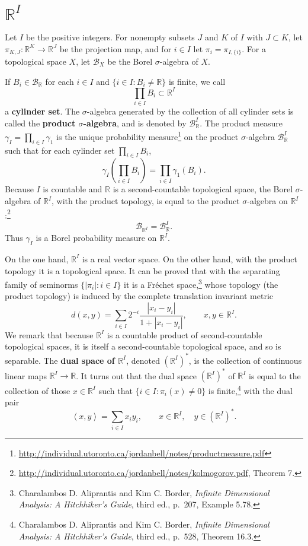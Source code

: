 \documentclass{article}
\newcommand{\inner}[2]{\left\langle #1, #2 \right\rangle}
\theoremstyle{definition}
\begin{document}
\section{$\mathbb{R}^I$}
Let $I$ be the positive integers. 
For nonempty subsets $J$ and $K$ of $I$ with $J \subset K$, let $\pi_{K,J}:\mathbb{R}^K \to \mathbb{R}^J$ be the projection
map, and for $i \in I$ let $\pi_i = \pi_{I,\{i\}}$. 
For a topological space $X$, let $\mathscr{B}_X$ be the Borel $\sigma$-algebra of $X$.

If $B_i \in \mathscr{B}_{\mathbb{R}}$ for each $i \in I$ and $\{i \in I: B_i \neq \mathbb{R}\}$ is finite,
we call
\[
\prod_{i \in I} B_i \subset \mathbb{R}^I
\]
a \textbf{cylinder set}. 
The $\sigma$-algebra generated by the collection of all cylinder sets is called the \textbf{product
$\sigma$-algebra}, and is denoted by
$\mathscr{B}_{\mathbb{R}}^I$.
The product measure $\gamma_I = \prod_{i \in I} \gamma_1$ is the unique probability measure\footnote{\url{http://individual.utoronto.ca/jordanbell/notes/productmeasure.pdf}} on the product $\sigma$-algebra $\mathscr{B}_{\mathbb{R}}^I$ such that
for each cylinder set $\prod_{i \in I} B_i$,
\[
\gamma_I \left( \prod_{i \in I} B_i \right) = \prod_{i \in I} \gamma_1(B_i).
\]
Because $I$ is countable and $\mathbb{R}$ is a second-countable topological space, the Borel $\sigma$-algebra of
$\mathbb{R}^I$, with the product topology, is equal to the product $\sigma$-algebra on $\mathbb{R}^I$:\footnote{\url{http://individual.utoronto.ca/jordanbell/notes/kolmogorov.pdf},
Theorem 7.}
\[
\mathscr{B}_{\mathbb{R}^I} = \mathscr{B}_{\mathbb{R}}^I.
\]
Thus $\gamma_I$ is a Borel probability measure on $\mathbb{R}^I$. 


On the one hand, $\mathbb{R}^I$ is a real vector space. On the other hand, with the product topology it is a topological space.
It can be proved that
with the separating family of seminorms $\{|\pi_i|: i \in I\}$ it is a Fr\'echet space,\footnote{Charalambos D. Aliprantis
and Kim C. Border, {\em Infinite Dimensional Analysis: A Hitchhiker's Guide}, third ed., p.~207, Example 5.78.} whose topology (the product topology) is induced by the complete
translation invariant metric
\[
d(x,y) = \sum_{i \in I} 2^{-i} \frac{|x_i-y_i|}{1+|x_i-y_i|},
\qquad x,y \in \mathbb{R}^I.
\]
We remark that because $\mathbb{R}^I$ is a countable product of second-countable topological spaces, it is itself
a second-countable topological space, and so is separable. The \textbf{dual space of $\mathbb{R}^I$}, denoted $(\mathbb{R}^I)^*$, is the collection
of continuous linear maps $\mathbb{R}^I \to \mathbb{R}$. It turns out that the dual space $(\mathbb{R}^I)^*$ of $\mathbb{R}^I$ is equal to the
collection of those $x \in \mathbb{R}^I$ such that $\{i \in I: \pi_i(x) \neq 0\}$ is finite,\footnote{Charalambos D. Aliprantis
and Kim C. Border, {\em Infinite Dimensional Analysis: A Hitchhiker's Guide}, third ed., p.~528, Theorem 16.3.} 
with the dual pair
\[
\inner{x}{y} = \sum_{i \in I} x_i y_i,\qquad x \in \mathbb{R}^I,\quad y \in (\mathbb{R}^I)^*.
\]
\end{document}

